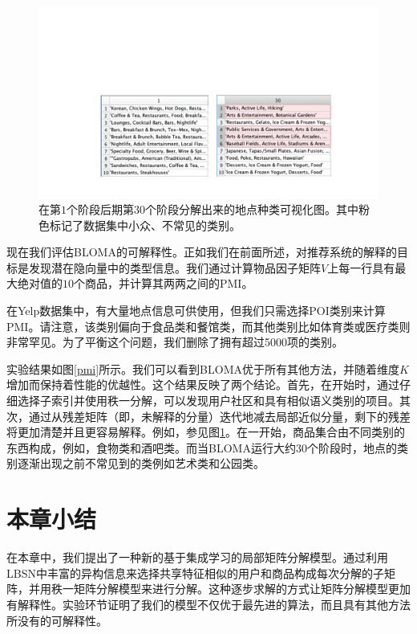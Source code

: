 \begin{figure}[!t]
\centering
\includegraphics[width=\textwidth]{pics/factors.pdf}
\caption{在第$1$个阶段后期第$30$个阶段分解出来的地点种类可视化图。其中粉色标记了数据集中小众、不常见的类别。} 
\label{factors}
\end{figure}

现在我们评估BLOMA的可解释性。正如我们在前面所述，对推荐系统的解释的目标是发现潜在隐向量中的类型信息。我们通过计算物品因子矩阵$V$上每一行具有最大绝对值的$10$个商品，并计算其两两之间的PMI。

在Yelp数据集中，有大量地点信息可供使用，但我们只需选择POI类别来计算PMI。请注意，该类别偏向于食品类和餐馆类，而其他类别比如体育类或医疗类则非常罕见。为了平衡这个问题，我们删除了拥有超过5000项的类别。

实验结果如图\ref{pmi}所示。我们可以看到BLOMA优于所有其他方法，并随着维度$ K $增加而保持着性能的优越性。这个结果反映了两个结论。首先，在开始时，通过仔细选择子索引并使用秩一分解，可以发现用户社区和具有相似语义类别的项目。其次，通过从残差矩阵（即，未解释的分量）迭代地减去局部近似分量，剩下的残差将更加清楚并且更容易解释。例如，参见图\ref{factors}。在一开始，商品集合由不同类别的东西构成，例如，食物类和酒吧类。而当BLOMA运行大约30个阶段时，地点的类别逐渐出现之前不常见到的类例如艺术类和公园类。





\section{本章小结}
\label{conclusion}
在本章中，我们提出了一种新的基于集成学习的局部矩阵分解模型。通过利用LBSN中丰富的异构信息来选择共享特征相似的用户和商品构成每次分解的子矩阵，并用秩一矩阵分解模型来进行分解。这种逐步求解的方式让矩阵分解模型更加有解释性。实验环节证明了我们的模型不仅优于最先进的算法，而且具有其他方法所没有的可解释性。
\newpage\mbox{}\thispagestyle{empty}\newpage


